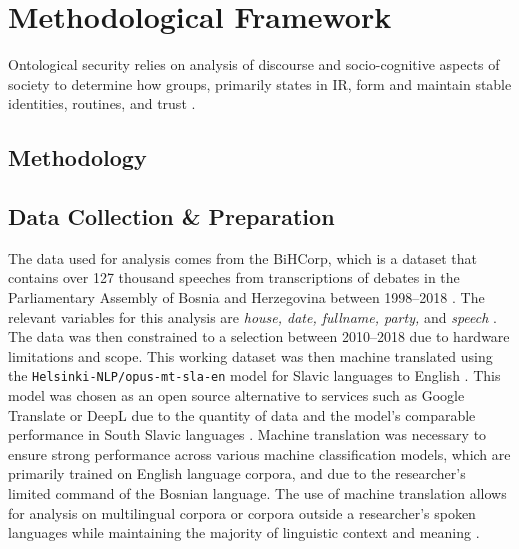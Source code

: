 \chapter{Methodological Framework}
\label{chap:four}

Ontological security relies on analysis of discourse and socio-cognitive aspects of society to determine how groups, primarily states in \ac{IR}, form and maintain stable identities, routines, and trust \citep{mitzenOntologicalSecurityWorld2006,kinnvall2004,subotic2015}. 

\section{Methodology}
\label{sec:method}



\section{Data Collection \& Preparation}
\label{sec:data_collection}


The data used for analysis comes from the BiHCorp, which is a dataset that contains over 127 thousand speeches from transcriptions of debates in the Parliamentary Assembly of Bosnia and Herzegovina between 1998--2018 \citep{mochtak2022}. The relevant variables for this analysis are \textit{house, date, fullname, party,} and \textit{speech} \citep{mochtak2022}. The data was then constrained to a selection between 2010--2018 due to hardware limitations and scope. This working dataset was then machine translated using the \texttt{Helsinki-NLP/opus-mt-sla-en} model for Slavic languages to English \citep{tiedemann2020}. This model was chosen as an open source alternative to services such as Google Translate or DeepL due to the quantity of data and the model's comparable performance in South Slavic languages \citep{tiedemann2020}. Machine translation was necessary to ensure strong performance across various machine classification models, which are primarily trained on English language corpora, and due to the researcher's limited command of the Bosnian language. The use of machine translation allows for analysis on multilingual corpora or corpora outside a researcher's spoken languages while maintaining the majority of linguistic context and meaning \citep[pg.~7-8]{mate2023}.

